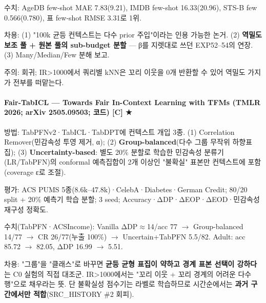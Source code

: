 \par\noindent \textbullet\enspace 수치: AgeDB few-shot MAE 7.83(9.21), IMDB few-shot 16.33(20.96), STS-B few 0.566(0.780), 표 few-shot RMSE 3.31로 1위.


\par\noindent \textbullet\enspace 차용: (1) "100k 균등 컨텍스트는 다수 prior 주입"이라는 인용 가능한 논거. (2) \textbf{역밀도 보조 풀 +\allowbreak{} 원본 풀의 sub-budget 분할} — β를 지렛대로 쓰던 EXP52–54의 연장. (3) Many/\allowbreak{}Median/\allowbreak{}Few 분해 보고.


\par\noindent \textbullet\enspace 주의: 회귀; IR>1000에서 쿼리별 kNN은 꼬리 이웃을 0개 반환할 수 있어 역밀도 가지가 전부를 떠맡는다.


\paragraph{Fair-TabICL — Towards Fair In-Context Learning with TFMs (TMLR 2026; arXiv 2505.09503; 코드) [C] ★}
\par\noindent \textbullet\enspace 방법: TabPFNv2·TabICL·TabDPT에 컨텍스트 개입 3종. (1) Correlation Remover(민감속성 투영 제거, α); (2) \textbf{Group-balanced}(다수 그룹 무작위 하향표집); (3) \textbf{Uncertainty-based}: 별도 20\% 분할로 학습한 민감속성 분류기(LR/\allowbreak{}TabPFN)의 conformal 예측집합이 2개 이상인 "불확실" 표본만 컨텍스트에 포함(coverage ε로 조절).


\par\noindent \textbullet\enspace 평가: ACS PUMS 5종(8.6k–47.8k)·CelebA·Diabetes·German Credit; 80/\allowbreak{}20 split +\allowbreak{} 20\% 예측기 학습 분할; 3 seed; Accuracy·ΔDP·ΔEOP·ΔEOD·민감속성 재구성 정확도.


\par\noindent \textbullet\enspace 수치(TabPFN·ACSIncome): Vanilla ΔDP\ensuremath{\approx}14/\allowbreak{}acc 77  \ensuremath{\rightarrow}  Group-balanced 14/\allowbreak{}77  \ensuremath{\rightarrow}  CR 26/\allowbreak{}77(누출 100\%)  \ensuremath{\rightarrow}  Uncertain+\allowbreak{}TabPFN 5.5/\allowbreak{}82. Adult: acc 85.72 \ensuremath{\rightarrow} 82.05, ΔDP 16.99 \ensuremath{\rightarrow} 5.51.


\par\noindent \textbullet\enspace 차용: "그룹"을 "클래스"로 바꾸면 \textbf{균등 균형 표집이 약하고 경계 표본 선택이 강하다}는 C0 실험의 직접 대조군. IR>1000에서는 "꼬리 이웃 +\allowbreak{} 꼬리 경계의 어려운 다수 행"으로 채우라는 뜻. 단 불확실성 점수기는 라벨로 학습하므로 시간순에서는 \textbf{과거 구간에서만 적합}(SRC\_\allowbreak{}HISTORY \#2 회피).


